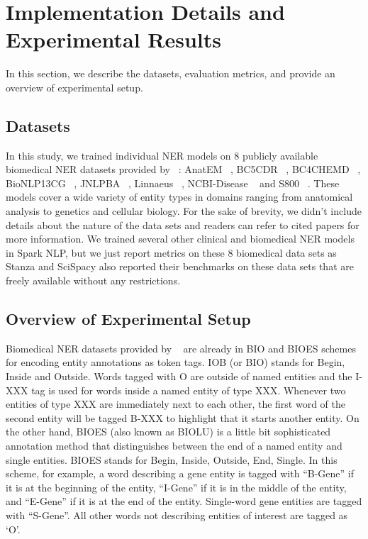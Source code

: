 \documentclass[a4paper,conference]{IEEEtran}
\begin{document}
\section{Implementation Details and Experimental Results}
\label{sec:experiments}

In this section, we describe the datasets, evaluation metrics, and provide an overview of experimental setup.

\subsection{Datasets}

In this study, we trained individual NER models on 8 publicly available biomedical NER datasets provided by ~\cite{wang2019cross}: AnatEM ~\cite{pyysalo2014anatomical}, BC5CDR ~\cite{li2016biocreative}, BC4CHEMD ~\cite{krallinger2015chemdner}, BioNLP13CG ~\cite{pyysalo2015overview}, JNLPBA ~\cite{kim2004introduction}, Linnaeus ~\cite{gerner2010linnaeus}, NCBI-Disease ~\cite{dougan2014ncbi} and S800 ~\cite{pafilis2013species}. These models cover a wide variety of entity types in domains ranging from anatomical analysis to genetics and cellular biology. For the sake of brevity, we didn't include details about the nature of the data sets and readers can refer to cited papers for more information. We trained several other clinical and biomedical NER models in Spark NLP, but we just report metrics on these 8 biomedical data sets as Stanza and SciSpacy also reported their benchmarks on these data sets that are freely available without any restrictions.

\subsection{Overview of Experimental Setup}

Biomedical NER datasets provided by ~\cite{wang2019cross} are already in BIO and BIOES schemes for encoding entity annotations as token tags. IOB (or BIO) stands for Begin, Inside and Outside. Words tagged with O are outside of named entities and the I-XXX tag is used for words inside a named entity of type XXX. Whenever two entities of type XXX are immediately next to each other, the first word of the second entity will be tagged B-XXX to highlight that it starts another entity. On the other hand, BIOES (also known as BIOLU) is a little bit sophisticated annotation method that distinguishes between the end of a named entity and single entities. BIOES stands for Begin, Inside, Outside, End, Single. In this scheme, for example, a word describing a gene entity is tagged with “B-Gene” if it is at the beginning of the entity, “I-Gene” if it is in the middle of the entity, and “E-Gene” if it is at the end of the entity. Single-word gene entities are tagged with “S-Gene”. All other words not describing entities of interest are tagged as ‘O’. 
\end{document}
